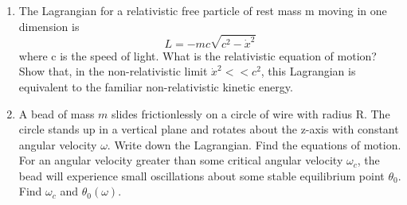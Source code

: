 \documentclass[fleqn]{article}
\begin{document}
\begin{enumerate}
    \item The Lagrangian for a relativistic free particle of rest mass m moving in
    one dimension is
    $$L=-mc\sqrt{c^2-\dot{x}^2}$$
    where c is the speed of light. What is the relativistic equation of motion? Show that, in the non-relativistic limit
    $\dot{x}^2 <<c^2$, this Lagrangian is equivalent to the familiar non-relativistic kinetic energy.   

    \item A bead of mass $m$ slides frictionlessly on a circle of wire with radius R.
    The circle stands up in a vertical plane and rotates about the z-axis
    with constant angular velocity $\omega$. Write down the Lagrangian. Find
    the equations of motion. For an angular velocity greater than some
    critical angular velocity $\omega_c$, the bead will experience small oscillations
    about some stable equilibrium point $\theta_0$. Find $\omega_c$ and $\theta_0(\omega)$.
  \end{enumerate}
\end{document}
